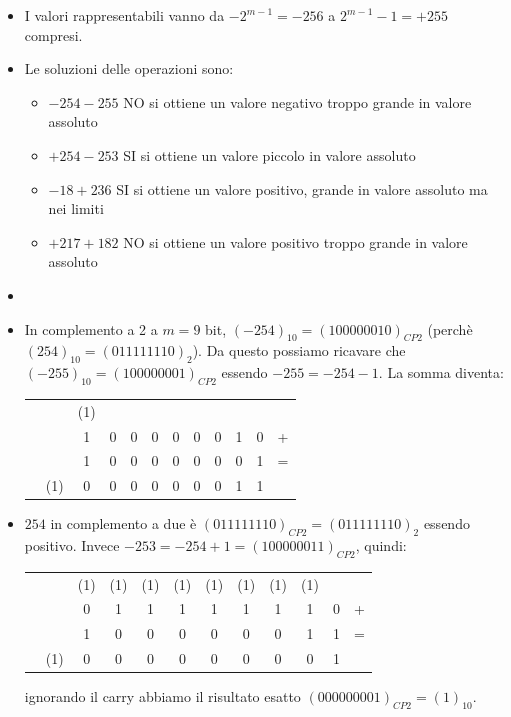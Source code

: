 \begin{Answer}[ref={ex:complemento}]
		\begin{itemize}
				\item[(a)] I valori rappresentabili vanno da $- 2^{m-1} = -256$ a $2^{m-1}-1 = +255$ compresi.
				\item[(b)] Le soluzioni delle operazioni sono:
				\begin{itemize}
						\item $-254 - 255$ NO si ottiene un valore negativo troppo grande in valore assoluto
						\item $+254 - 253$ SI si ottiene un valore piccolo in valore assoluto
						\item $- 18 + 236$ SI si ottiene un valore positivo, grande in valore assoluto ma nei limiti
						\item $+217 + 182$ NO si ottiene un valore positivo troppo grande in valore assoluto
						\end{itemize}
				\item[(c)]
						\item In complemento a 2 a $m = 9$ bit, $(-254)_{10} = (100000010)_{CP2}$ (perch\`e $(254)_{10} = (011111110)_2$). Da questo possiamo ricavare che $(-255)_{10} = (100000001)_{CP2}$ essendo $-255 = -254 - 1$. La somma diventa:\\
						\begin{table}[H]
						\centering
						\begin{tabular}{ccccccccccc|c}
								&& (1)\\ 
								&& 1 & 0 & 0 & 0 & 0 & 0 & 0 & 1 &0 &+\\
								&& 1 & 0 & 0 & 0 & 0 & 0 & 0 & 0 &1 &=\\
								\hline
								[1]&(1)& 0 & 0 & 0 & 0 & 0 & 0 & 0 & 1 &1 &\\
						\end{tabular}
						\end{table}
						\item $254$ in complemento a due \`e $(011111110)_{CP2} = (011111110)_2$ essendo positivo. Invece $-253 = -254 +1 = (100000011)_{CP2}$, quindi:\\
						\begin{table}[H]
						\centering
						\begin{tabular}{ccccccccccc|c}
								&      &(1)&(1)&(1)&(1)&(1)&(1)&(1)&(1)&  & \\
								&      & 0 & 1 & 1 & 1 & 1 & 1 & 1 & 1 &0 &+\\
								&      & 1 & 0 & 0 & 0 & 0 & 0 & 0 & 1 &1 &=\\
								\hline
								[0]&(1)& 0 & 0 & 0 & 0 & 0 & 0 & 0 & 0 &1 &\\
						\end{tabular}
						\end{table}
						ignorando il carry abbiamo il risultato esatto $(000000001)_{CP2} = (1)_{10}$.
				\end{itemize}
\end{Answer}